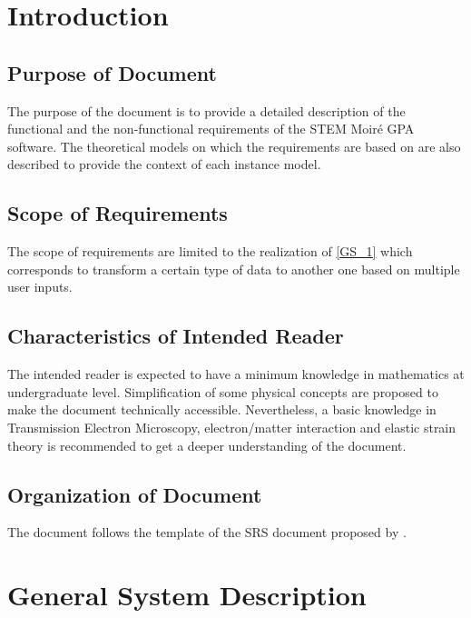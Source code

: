 \documentclass[12pt]{article}
\newcommand{\progname}{STEM Moir{\'e} GPA}
\begin{document}
\newpage
{}

\section{Introduction}

\subsection{Purpose of Document}

The purpose of the document is to provide a detailed description of the functional and the non-functional requirements of the \progname{} software.  The theoretical models on which the requirements are based on are also described to provide the context of each instance model.


\subsection{Scope of Requirements} 

The scope of requirements are limited to the realization of \cref{GS_1} which corresponds to transform a certain type of data to another one based on multiple user inputs.

\subsection{Characteristics of Intended Reader} 

The intended reader is expected to have a minimum knowledge in mathematics at
undergraduate level. Simplification of some physical concepts are proposed to
make the document technically accessible. Nevertheless, a basic knowledge in
Transmission Electron Microscopy, electron/matter interaction and elastic strain
theory is recommended to get a deeper understanding of the document. 

\subsection{Organization of Document}

The document follows the template of the SRS document proposed by \cite{SmithAndLai2005, SmithEtAl2007}. 

\section{General System Description}
\end{document}
